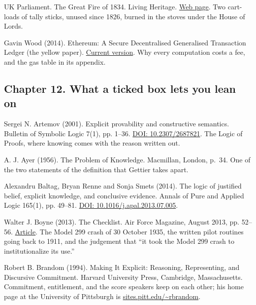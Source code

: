 \documentclass[11pt,twoside]{article}
\theoremstyle{thielethm}
\theoremstyle{thieledef}
\theoremstyle{thieledef}
\theoremstyle{thieledef}
\theoremstyle{thielethm}
\theoremstyle{thieleobs}
\theoremstyle{thielethm}
\begin{document}
\noindent UK Parliament. The Great Fire of 1834. Living Heritage. \href{https://www.parliament.uk/about/living-heritage/building/palace/architecture/palacestructure/great-fire/}{Web page}. Two cart-loads of tally sticks, unused since 1826, burned in the stoves under the House of Lords.
\par\medskip

\noindent Gavin Wood (2014). Ethereum: A Secure Decentralised Generalised Transaction Ledger (the yellow paper). \href{https://ethereum.github.io/yellowpaper/paper.pdf}{Current version}. Why every computation costs a fee, and the gas table in its appendix.
\par\medskip

\subsection*{Chapter 12. What a ticked box lets you lean on}

\noindent Sergei N. Artemov (2001). Explicit provability and constructive semantics. Bulletin of Symbolic Logic 7(1), pp. 1--36. \href{https://doi.org/10.2307/2687821}{DOI: 10.2307/2687821}. The Logic of Proofs, where knowing comes with the reason written out.
\par\medskip

\noindent A. J. Ayer (1956). The Problem of Knowledge. Macmillan, London, p.~34. One of the two statements of the definition that Gettier takes apart.
\par\medskip

\noindent Alexandru Baltag, Bryan Renne and Sonja Smets (2014). The logic of justified belief, explicit knowledge, and conclusive evidence. Annals of Pure and Applied Logic 165(1), pp. 49--81. \href{https://doi.org/10.1016/j.apal.2013.07.005}{DOI: 10.1016/j.apal.2013.07.005}.
\par\medskip

\noindent Walter J. Boyne (2013). The Checklist. Air Force Magazine, August 2013, pp. 52--56. \href{https://www.airandspaceforces.com/article/0813checklist/}{Article}. The Model 299 crash of 30 October 1935, the written pilot routines going back to 1911, and the judgement that ``it took the Model 299 crash to institutionalize its use.''
\par\medskip

\noindent Robert B. Brandom (1994). Making It Explicit: Reasoning, Representing, and Discursive Commitment. Harvard University Press, Cambridge, Massachusetts. Commitment, entitlement, and the score speakers keep on each other; his home page at the University of Pittsburgh is \href{https://sites.pitt.edu/~rbrandom/}{sites.pitt.edu/\textasciitilde rbrandom}.
\par\medskip
\end{document}
